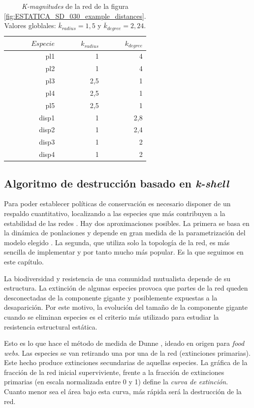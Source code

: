 \begin{table}[htbp]
\small
  \centering
    \begin{tabular}{rrr}
    \toprule
    $Especie$ & $k_{radius}$ & $k_{degree}$  \\
    \midrule
    pl1  & 1    & 4 \\
    pl2  & 1    & 4 \\
    pl3  & 2,5  & 1 \\
    pl4  & 2,5  & 1 \\
    pl5  & 2,5  & 1 \\
    disp1 & 1    & 2,8 \\
    disp2 & 1    & 2,4 \\
    disp3 & 1    & 2 \\
    disp4 & 1    & 2 \\
    \bottomrule
    \end{tabular}%
  \caption{\label{table:table_SD_030} \textit{K-magnitudes} de la red de la figura \ref{fig:ESTATICA_SD_030_example_distances}. Valores globlales: $\overline k_{radius} = 1,5 $ y $\overline k_{degree} = 2,24$.}
\end{table}%

\subsection{Algoritmo de destrucción basado en \textit{k-shell}}

Para poder establecer políticas de conservación es necesario disponer de un respaldo cuantitativo, localizando a las especies que más contribuyen a la estabilidad de las redes \cite{sole2001fragility, dakos2014resilience, thebault2010stability, suweis2013emergence, santamaria2015removing}.  Hay dos aproximaciones posibles. La primera se basa en la dinámica de ponlaciones y depende en gran medida de la parametrización del modelo elegido \cite{dakos2014critical}. La segunda, que utiliza solo la topología de la red, es más sencilla de implementar y por tanto mucho más popular. Es la que seguimos en este capítulo.

La biodiversidad y resistencia de una comunidad mutualista depende de su estructura. La extinción de algunas especies provoca que partes de la red queden desconectadas de la componente gigante y posiblemente expuestas a la desaparición. Por este motivo, la evolución del tamaño de la componente gigante cuando se eliminan especies es el criterio más utilizado para estudiar la resistencia estructural estática.

Esto es lo que hace el método de medida de Dunne \cite{dunne2002biodiversity}, ideado en origen para \textit{food webs}. Las especies se van retirando una por una de la red (extinciones primarias). Este hecho produce extinciones secundarias de aquellas especies. La gráfica de la fracción de la red inicial superviviente, frente a la fracción de extinciones primarias (en escala normalizada entre 0 y 1) define la \textit{curva de extinción}. Cuanto menor sea el área bajo esta curva, más rápida será la destrucción de la red.

